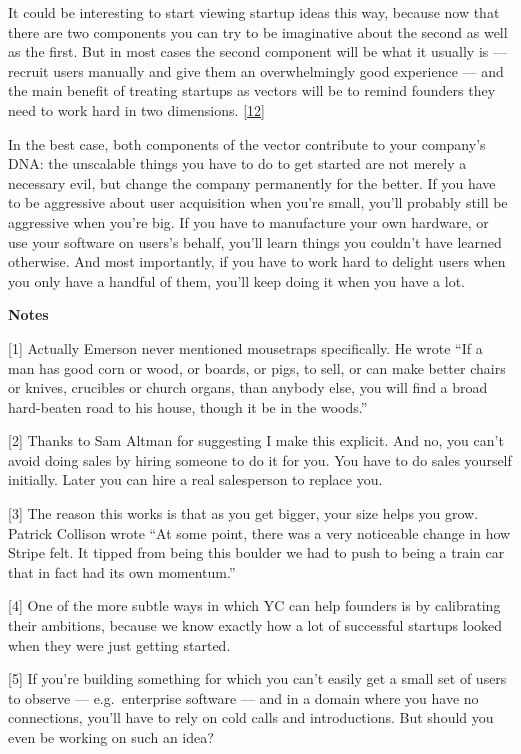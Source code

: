It could be interesting to start viewing startup ideas this way, because
now that there are two components you can try to be imaginative about
the second as well as the first. But in most cases the second component
will be what it usually is --- recruit users manually and give them an
overwhelmingly good experience --- and the main benefit of treating
startups as vectors will be to remind founders they need to work hard in
two dimensions. {[}\hyperref[f12n]{12}{]}

In the best case, both components of the vector contribute to your
company's DNA: the unscalable things you have to do to get started are
not merely a necessary evil, but change the company permanently for the
better. If you have to be aggressive about user acquisition when you're
small, you'll probably still be aggressive when you're big. If you have
to manufacture your own hardware, or use your software on users's
behalf, you'll learn things you couldn't have learned otherwise. And
most importantly, if you have to work hard to delight users when you
only have a handful of them, you'll keep doing it when you have a lot.

\textbf{Notes}

{[}1{]} Actually Emerson never mentioned mousetraps specifically. He
wrote ``If a man has good corn or wood, or boards, or pigs, to sell, or
can make better chairs or knives, crucibles or church organs, than
anybody else, you will find a broad hard-beaten road to his house,
though it be in the woods.''

{[}2{]} Thanks to Sam Altman for suggesting I make this explicit. And
no, you can't avoid doing sales by hiring someone to do it for you. You
have to do sales yourself initially. Later you can hire a real
salesperson to replace you.

{[}3{]} The reason this works is that as you get bigger, your size helps
you grow. Patrick Collison wrote ``At some point, there was a very
noticeable change in how Stripe felt. It tipped from being this boulder
we had to push to being a train car that in fact had its own momentum.''

{[}4{]} One of the more subtle ways in which YC can help founders is by
calibrating their ambitions, because we know exactly how a lot of
successful startups looked when they were just getting started.

{[}5{]} If you're building something for which you can't easily get a
small set of users to observe --- e.g.~enterprise software --- and in a
domain where you have no connections, you'll have to rely on cold calls
and introductions. But should you even be working on such an idea?

